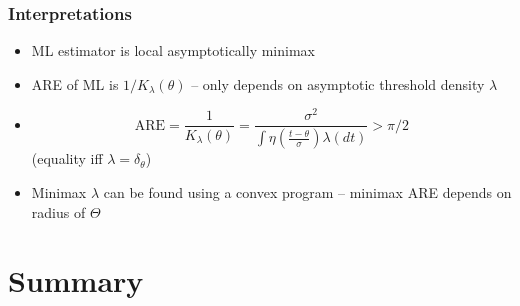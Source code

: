 \documentclass[mathserif]{beamer}
\begin{document}
\begin{frame}
\frametitle{Interpretations}
\begin{itemize}
\pause
\item ML estimator is local asymptotically minimax 
\pause
\item ARE of ML is $1/K_{\lambda}(\theta)$ -- 
only depends on asymptotic threshold density $\lambda$
\pause
\item  
\[
\mathrm{ARE} = \frac{1}{K_{\lambda}(\theta)}  = \frac{\sigma^2}{\int \eta \left( \frac{t-\theta}{\sigma}\right) \lambda(dt)}
> \pi / 2
\]
(equality iff $\lambda = \delta_{\theta}$)
\pause
\item Minimax $\lambda$ can be found using a convex program -- minimax ARE  depends on radius of $\Theta$
%

\end{itemize}

\end{frame}



\section{Summary}
\end{document}
